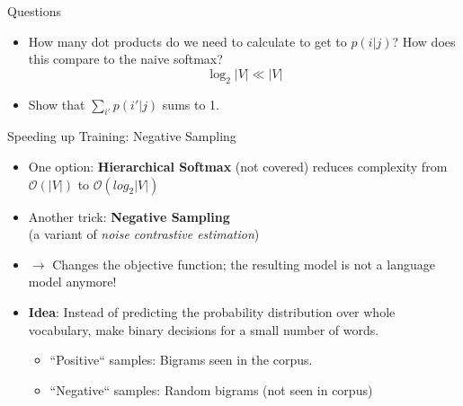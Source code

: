 
\begin{vbframe}{Questions}

\vfill

\begin{itemize}
	\item \ques How many dot products do we need to calculate to get to $p(i|j)$? How does this compare to the naive softmax?
		 $$\log_2|V| \ll |V|$$

	\vskip5mm
	\item \ques Show that $\sum_{i'} p(i'|j)$ sums to 1.
\end{itemize}

\vfill

\end{vbframe}

\fi


\begin{vbframe}{Speeding up Training: Negative Sampling}

\vfill

\begin{itemize}
	\item One option: \textbf{Hierarchical Softmax} (not covered) reduces complexity from $\mathcal{O}(|V|)$ to $\mathcal{O}(log_2|V|)$
	\item Another trick: \textbf{Negative Sampling}\\ (a variant of \emph{noise contrastive estimation})
	\item[] $\to$ Changes the objective function; the resulting model is not a language model anymore!
	\item \textbf{Idea}: Instead of predicting the probability distribution over whole vocabulary, make binary decisions for a small number of words.
			\begin{itemize}
				\item ``Positive`` samples: Bigrams seen in the corpus.
				\item ``Negative`` samples: Random bigrams (not seen in corpus)
			\end{itemize}
\end{itemize}

\vfill

\end{vbframe}


